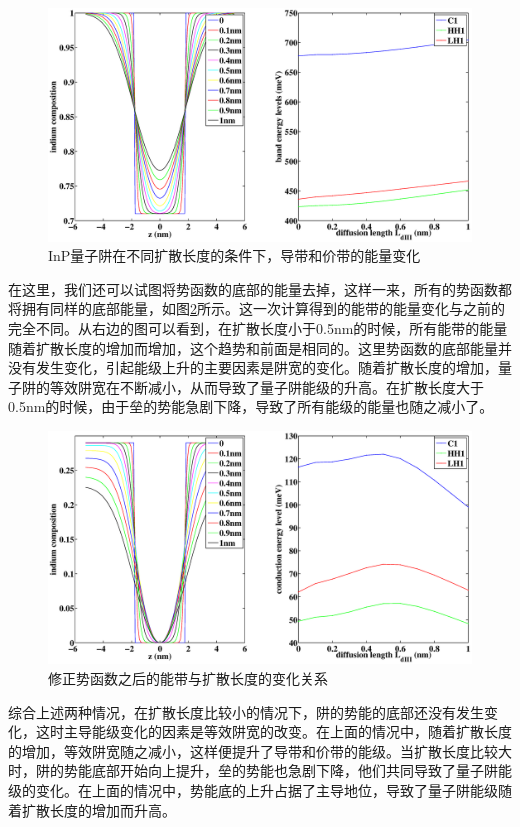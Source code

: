\documentclass{ZJUthesis}
\begin{document}
\begin{figure}[!t]
    \centering
    \includegraphics[width=1.0\textwidth]{./Pictures/Ld_1.eps}
    \caption{InP量子阱在不同扩散长度的条件下，导带和价带的能量变化}
    \label{fig_Ld_1}
\end{figure}

在这里，我们还可以试图将势函数的底部的能量去掉，这样一来，所有的势函数都将拥有同样的底部能量，如图\ref{fig_Ld_2}所示。这一次计算得到的能带的能量变化与之前的完全不同。从右边的图可以看到，在扩散长度小于0.5nm的时候，所有能带的能量随着扩散长度的增加而增加，这个趋势和前面是相同的。这里势函数的底部能量并没有发生变化，引起能级上升的主要因素是阱宽的变化。随着扩散长度的增加，量子阱的等效阱宽在不断减小，从而导致了量子阱能级的升高。在扩散长度大于0.5nm的时候，由于垒的势能急剧下降，导致了所有能级的能量也随之减小了。

\begin{figure}[!t]
    \centering
    \includegraphics[width=1.0\textwidth]{./Pictures/Ld_2.eps}
    \caption{修正势函数之后的能带与扩散长度的变化关系}
    \label{fig_Ld_2}
\end{figure}

综合上述两种情况，在扩散长度比较小的情况下，阱的势能的底部还没有发生变化，这时主导能级变化的因素是等效阱宽的改变。在上面的情况中，随着扩散长度的增加，等效阱宽随之减小，这样便提升了导带和价带的能级。当扩散长度比较大时，阱的势能底部开始向上提升，垒的势能也急剧下降，他们共同导致了量子阱能级的变化。在上面的情况中，势能底的上升占据了主导地位，导致了量子阱能级随着扩散长度的增加而升高。
\end{document}
